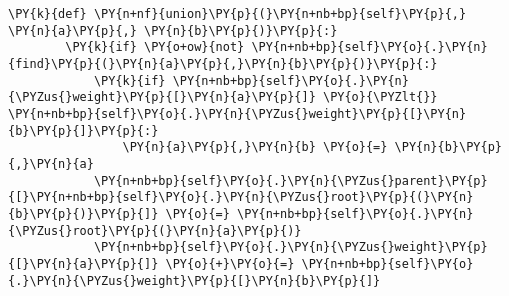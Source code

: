 \begin{Verbatim}[commandchars=\\\{\}]
    \PY{k}{def} \PY{n+nf}{union}\PY{p}{(}\PY{n+nb+bp}{self}\PY{p}{,} \PY{n}{a}\PY{p}{,} \PY{n}{b}\PY{p}{)}\PY{p}{:}
        \PY{k}{if} \PY{o+ow}{not} \PY{n+nb+bp}{self}\PY{o}{.}\PY{n}{find}\PY{p}{(}\PY{n}{a}\PY{p}{,}\PY{n}{b}\PY{p}{)}\PY{p}{:}
            \PY{k}{if} \PY{n+nb+bp}{self}\PY{o}{.}\PY{n}{\PYZus{}weight}\PY{p}{[}\PY{n}{a}\PY{p}{]} \PY{o}{\PYZlt{}} \PY{n+nb+bp}{self}\PY{o}{.}\PY{n}{\PYZus{}weight}\PY{p}{[}\PY{n}{b}\PY{p}{]}\PY{p}{:}
                \PY{n}{a}\PY{p}{,}\PY{n}{b} \PY{o}{=} \PY{n}{b}\PY{p}{,}\PY{n}{a}
            \PY{n+nb+bp}{self}\PY{o}{.}\PY{n}{\PYZus{}parent}\PY{p}{[}\PY{n+nb+bp}{self}\PY{o}{.}\PY{n}{\PYZus{}root}\PY{p}{(}\PY{n}{b}\PY{p}{)}\PY{p}{]} \PY{o}{=} \PY{n+nb+bp}{self}\PY{o}{.}\PY{n}{\PYZus{}root}\PY{p}{(}\PY{n}{a}\PY{p}{)}
            \PY{n+nb+bp}{self}\PY{o}{.}\PY{n}{\PYZus{}weight}\PY{p}{[}\PY{n}{a}\PY{p}{]} \PY{o}{+}\PY{o}{=} \PY{n+nb+bp}{self}\PY{o}{.}\PY{n}{\PYZus{}weight}\PY{p}{[}\PY{n}{b}\PY{p}{]}
\end{Verbatim}
